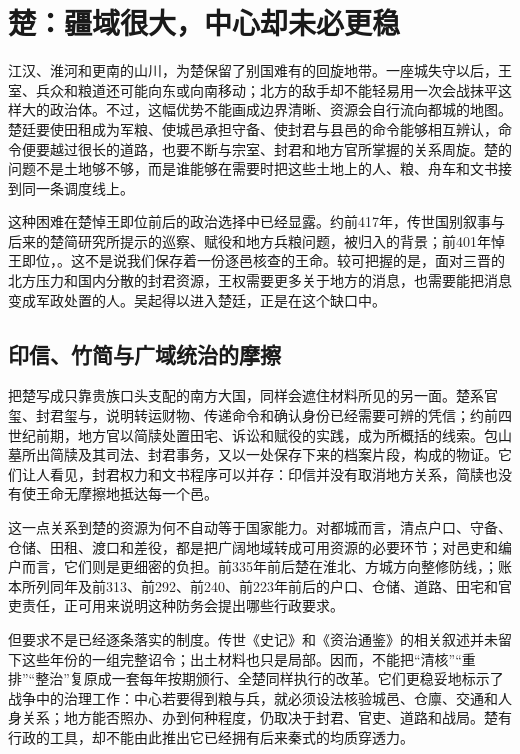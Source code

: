 \section{楚：疆域很大，中心却未必更稳}

江汉、淮河和更南的山川，为楚保留了别国难有的回旋地带。一座城失守以后，王室、兵众和粮道还可能向东或向南移动；北方的敌手却不能轻易用一次会战抹平这样大的政治体。不过，这幅优势不能画成边界清晰、资源会自行流向都城的地图。楚廷要使田租成为军粮、使城邑承担守备、使封君与县邑的命令能够相互辨认，命令便要越过很长的道路，也要不断与宗室、封君和地方官所掌握的关系周旋。楚的问题不是土地够不够，而是谁能够在需要时把这些土地上的人、粮、舟车和文书接到同一条调度线上。

这种困难在楚悼王即位前后的政治选择中已经显露。约前417年，传世国别叙事与后来的楚简研究所提示的巡察、赋役和地方兵粮问题，被归入的背景；前401年悼王即位，。这不是说我们保存着一份逐邑核查的王命。较可把握的是，面对三晋的北方压力和国内分散的封君资源，王权需要更多关于地方的消息，也需要能把消息变成军政处置的人。吴起得以进入楚廷，正是在这个缺口中。

\subsection{印信、竹简与广域统治的摩擦}

把楚写成只靠贵族口头支配的南方大国，同样会遮住材料所见的另一面。楚系官玺、封君玺与，说明转运财物、传递命令和确认身份已经需要可辨的凭信；约前四世纪前期，地方官以简牍处置田宅、诉讼和赋役的实践，成为所概括的线索。包山墓所出简牍及其司法、封君事务，又以一处保存下来的档案片段，构成的物证。它们让人看见，封君权力和文书程序可以并存：印信并没有取消地方关系，简牍也没有使王命无摩擦地抵达每一个邑。

这一点关系到楚的资源为何不自动等于国家能力。对都城而言，清点户口、守备、仓储、田租、渡口和差役，都是把广阔地域转成可用资源的必要环节；对邑吏和编户而言，它们则是更细密的负担。前335年前后楚在淮北、方城方向整修防线，；账本所列同年及前313、前292、前240、前223年前后的户口、仓储、道路、田宅和官吏责任，正可用来说明这种防务会提出哪些行政要求。

但要求不是已经逐条落实的制度。传世《史记》和《资治通鉴》的相关叙述并未留下这些年份的一组完整诏令；出土材料也只是局部。因而，不能把“清核”“重排”“整治”复原成一套每年按期颁行、全楚同样执行的改革。它们更稳妥地标示了战争中的治理工作：中心若要得到粮与兵，就必须设法核验城邑、仓廪、交通和人身关系；地方能否照办、办到何种程度，仍取决于封君、官吏、道路和战局。楚有行政的工具，却不能由此推出它已经拥有后来秦式的均质穿透力。


